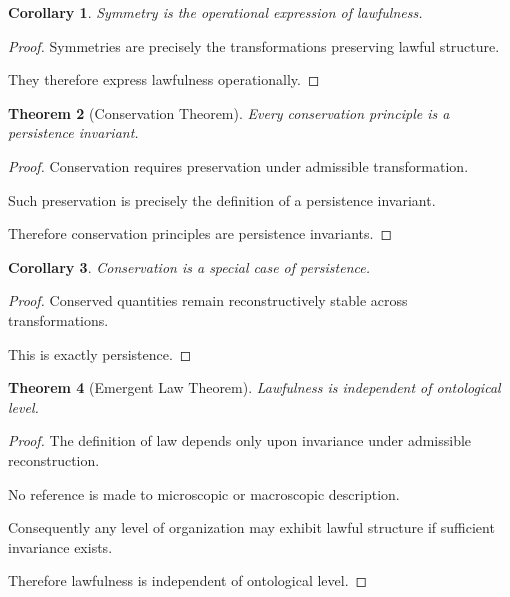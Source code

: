 \documentclass[12pt,oneside]{article}
\newtheorem{theorem}{Theorem}[section] \newtheorem{lemma}[theorem]{Lemma} \newtheorem{proposition}[theorem]{Proposition} \newtheorem{corollary}[theorem]{Corollary}
\theoremstyle{definition}
\begin{document}
\begin{corollary}

Symmetry is the operational expression of lawfulness.

\end{corollary}

\begin{proof}

Symmetries are precisely the transformations preserving lawful structure.

They therefore express lawfulness operationally.

\end{proof}

\begin{theorem}[Conservation Theorem]

Every conservation principle is a persistence invariant.

\end{theorem}

\begin{proof}

Conservation requires preservation under admissible transformation.

Such preservation is precisely the definition of a persistence invariant.

Therefore conservation principles are persistence invariants.

\end{proof}

\begin{corollary}

Conservation is a special case of persistence.

\end{corollary}

\begin{proof}

Conserved quantities remain reconstructively stable across transformations.

This is exactly persistence.

\end{proof}

\begin{theorem}[Emergent Law Theorem]

Lawfulness is independent of ontological level.

\end{theorem}

\begin{proof}

The definition of law depends only upon invariance under admissible reconstruction.

No reference is made to microscopic or macroscopic description.

Consequently any level of organization may exhibit lawful structure if sufficient invariance exists.

Therefore lawfulness is independent of ontological level.

\end{proof}
\end{document}
